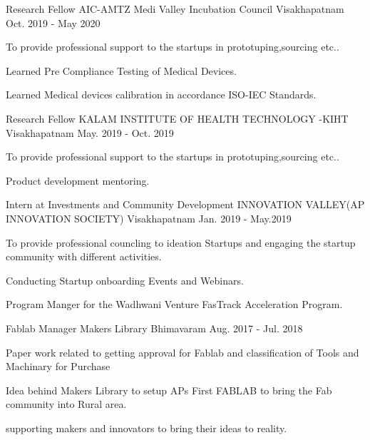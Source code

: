 \begin{cventries}
	\cventry
    {Research Fellow}
	{AIC-AMTZ Medi Valley Incubation Council}
	{Visakhapatnam}
	{Oct. 2019 - May 2020}
	{
		\begin{cvitems}
			\item {To provide professional support to the startups in prototuping,sourcing etc..}
			\item { Learned Pre Compliance Testing of Medical Devices.}
			\item { Learned Medical devices calibration in accordance ISO-IEC Standards.}
		\end{cvitems}
	}

 \cventry
    {Research Fellow}
    {KALAM INSTITUTE OF HEALTH TECHNOLOGY -KIHT}
    {Visakhapatnam}
    {May. 2019 - Oct. 2019}
    {
      \begin{cvitems}
        \item {To provide professional support to the startups in prototuping,sourcing etc..}
        \item {Product development mentoring.}
      \end{cvitems}
    }

  \cventry
    {Intern at Investments and Community Development}
    {INNOVATION VALLEY(AP INNOVATION SOCIETY)}
    {Visakhapatnam}
    {Jan. 2019 - May.2019}
    {
      \begin{cvitems}
        \item {To provide professional councling to ideation Startups and engaging the startup community with different activities.}
        \item {Conducting Startup onboarding Events and Webinars.}
        \item {Program Manger for the Wadhwani Venture FasTrack Acceleration Program.}
      \end{cvitems}
    }

  \cventry
    {Fablab Manager}
    {Makers Library}
    {Bhimavaram}
    {Aug. 2017 - Jul. 2018}
    {
      \begin{cvitems}
        \item {Paper work related to getting approval for Fablab and classification of Tools and Machinary for Purchase}
	\item{Idea behind Makers Library to setup APs First FABLAB to bring the Fab community into Rural area.}
        \item {supporting makers and innovators to bring their ideas to reality.}
        \item{                                           }
      \end{cvitems}
    }


\end{cventries}
